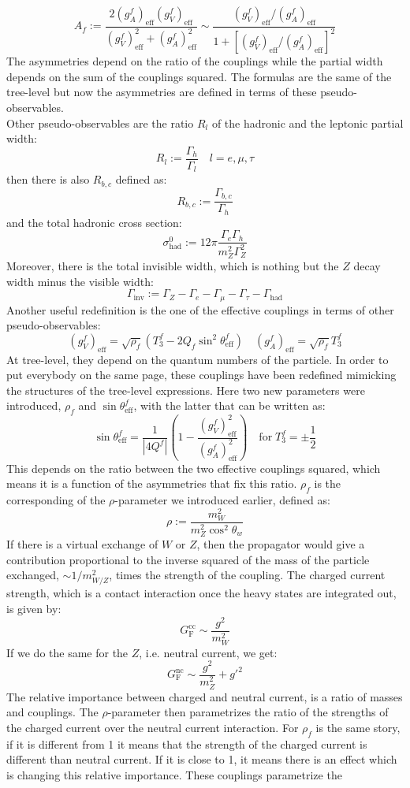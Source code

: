 \documentclass[../main.tex]{subfiles}
\begin{document}
\[
A_f:=\frac{2(g_A^f)_{\text{eff}}(g_V^f)_{\text{eff}}}{(g_V^f)_{\text{eff}}^2+(g_A^f)_{\text{eff}}^2}\sim\frac{(g_V^f)_{\text{eff}}/(g_A^f)_{\text{eff}}}{1+[(g_V^f)_{\text{eff}}/(g_A^f)_{\text{eff}}]^2}
\]
The asymmetries depend on the ratio of the couplings while the partial width depends on the sum of the couplings squared. The formulas are the same of the tree-level but now the asymmetries are defined in terms of these pseudo-observables.\\ Other pseudo-observables are the ratio $R_l$ of the hadronic and the leptonic partial width:
\[
R_l:=\frac{\Gamma_h}{\Gamma_l} \quad l=e,\mu,\tau
\]
then there is also $R_{b,c}$ defined as:
\[
R_{b,c}:=\frac{\Gamma_{b,c}}{\Gamma_h}
\]
and the total hadronic cross section:
\[
\sigma_{\text{had}}^0:=12\pi\frac{\Gamma_e\Gamma_h}{m_Z^2\Gamma_Z^2}
\]
Moreover, there is the total invisible width, which is nothing but the $Z$ decay width minus the visible width:
\[
\Gamma_{\text{inv}}:=\Gamma_Z-\Gamma_e-\Gamma_\mu-\Gamma_\tau-\Gamma_{\text{had}}
\]
Another useful redefinition is the one of the effective couplings in terms of other pseudo-observables:
\[
(g_V^f)_{\text{eff}}=\sqrt{\rho_f}(T_3^f-2Q_f\sin^2\theta_{\text{eff}}^f) \quad (g_A^f)_{\text{eff}}=\sqrt{\rho_f}T_3^f
\]
At tree-level, they depend on the quantum numbers of the particle. In order to put everybody on the same page, these couplings have been redefined mimicking the structures of the tree-level expressions. Here two new parameters were introduced, $\rho_f$ and $\sin\theta_{\text{eff}}^f$, with the latter that can be written as:
\[
\sin\theta_{\text{eff}}^f=\frac{1}{|4Q^f|}\left(1-\frac{(g_V^f)_{\text{eff}}^2}{(g_A^f)_{\text{eff}}^2}\right) \quad \text{for}\;T_3^f=\pm\frac{1}{2}
\]
This depends on the ratio between the two effective couplings squared, which means it is a function of the asymmetries that fix this ratio. $\rho_f$ is the corresponding of the $\rho$-parameter we introduced earlier, defined as:
\[
\rho:=\frac{m_W^2}{m_Z^2\cos^2\theta_w}
\]
If there is a virtual exchange of $W$ or $Z$, then the propagator would give a contribution proportional to the inverse squared of the mass of the particle exchanged, $\sim1/m^2_{W/Z}$, times the strength of the coupling. The charged current strength, which is a contact interaction once the heavy states are integrated out, is given by:
\[
G_{\text{F}}^{\text{cc}}\sim\frac{g^2}{m_W^2}
\]
If we do the same for the $Z$, i.e. neutral current, we get:
\[
G_{\text{F}}^{\text{nc}}\sim\frac{g^2}{m_Z^2}+g'^2
\]
The relative importance between charged and neutral current, is a ratio of masses and couplings. The $\rho$-parameter then parametrizes the ratio of the strengths of the charged current over the neutral current interaction. For $\rho_f$ is the same story, if it is different from 1 it means that the strength of the charged current is different than neutral current. If it is close to 1, it means there is an effect which is changing this relative importance. These couplings parametrize the 
\end{document}
